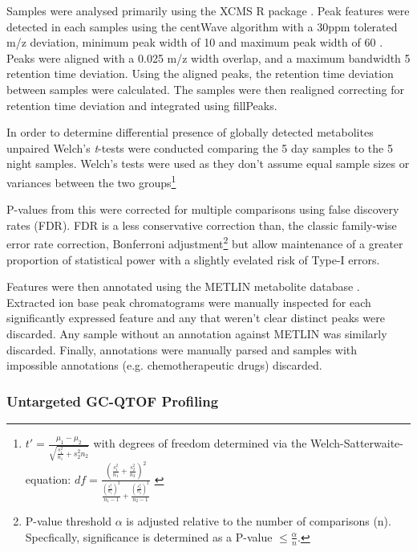 Samples were analysed primarily using the XCMS R package \citep{Smith2006,Tautenhahn2012}.
Peak features were detected in each samples using the centWave algorithm with a 30ppm tolerated m/z deviation,
minimum peak width of 10 and maximum peak width of 60 \citep{Tautenhahn2008}. 
Peaks were aligned with a 0.025 m/z width overlap, and a maximum bandwidth 5 retention time
deviation. Using the aligned peaks, the retention time deviation between samples were
calculated.  The samples were then realigned correcting for retention time deviation and
integrated using fillPeaks. 

In order to determine differential presence of globally detected metabolites
unpaired Welch's \textit{t}-tests were conducted comparing the 5 day samples to the 5
night samples. Welch's tests were used as they don't assume equal sample sizes or variances
between the two groups\citep{Welch1947}\footnote{
    \(t' = \frac{\mu_1 - \mu_2}{\sqrt{\frac{s^2_1}{n_1} + {s^2_2}{n_2}}}\)
    with degrees of freedom determined via the Welch-Satterwaite-equation:
    \(df = \frac{(\frac{s^2_1}{n_1} + \frac{s^2_2}{n_2})^2}{\frac{(\frac{s^2_1}{n_1})^2}{n_1 - 1} + \frac{(\frac{s^2_2}{n_2})^2}{n_2 - 1}}\)
    \citep{Ruxton2006}
}

P-values from this were corrected 
for multiple comparisons using false discovery rates (FDR).  FDR is a
less conservative correction than, the classic family-wise error rate correction,
Bonferroni adjustment\footnote{
    P-value threshold \(\alpha\) is adjusted relative to the number of comparisons (n). 
Specfically, significance is determined as a P-value \(\leq \frac{\alpha}{n}\).} but
allow maintenance of a greater proportion of statistical power with a 
slightly evelated risk of Type-I errors. 

Features were then annotated using the METLIN metabolite database \citep{Smith2005a,Sana2008,Tautenhahn2012a}.
Extracted ion base peak chromatograms were manually inspected for each significantly expressed feature
and any that weren't clear distinct peaks were discarded. Any sample without
an annotation against METLIN was similarly discarded. Finally, annotations
were manually parsed and samples with impossible annotations (e.g. 
chemotherapeutic drugs) discarded.  

\subsubsection{Untargeted GC-QTOF Profiling}


